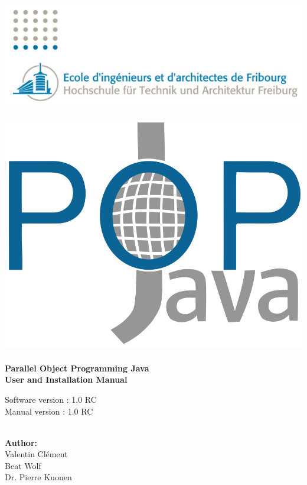 
\begin{titlepage}
 
\begin{center}
\includegraphics[scale=0.5]{eif_logo.png}

\includegraphics[scale=0.2]{popjava_official.png}\\[1.5cm]


\HRule \\[1cm]
{ \huge \bfseries Parallel Object Programming Java\\[0.3cm]
User and Installation Manual}\\[0.5cm]
 \begin{center}
 Software version : 1.0 RC\\
 Manual version : 1.0 RC
 \end{center}
\HRule \\[2cm]
 
\textbf{Author:}\\
Valentin Clément\\
Beat Wolf\\
Dr. Pierre Kuonen\\[0.3cm]

 
\vfill
  
\end{center}
 
\end{titlepage}
